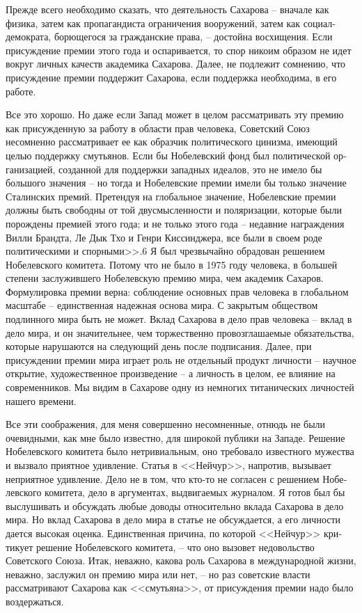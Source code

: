 \documentclass{book}
\begin{document}
Прежде всего необходимо сказать, что деятельность Сахарова -- вначале как физика, затем как пропагандиста ограничения вооружений, затем как социал-демократа, борющегося за гражданские права, -- достойна восхищения. Ес­ли присуждение премии этого года и оспаривается, то спор ни­коим образом не идет вокруг личных качеств академика Са­харова. Далее, не подлежит сомнению, что присуждение пре­мии поддержит Сахарова, если поддержка необходима, в его работе.

Все это хорошо. Но даже если Запад может в целом рассмат­ривать эту премию как присужденную за работу в области прав человека, Советский Союз несомненно рассматривает ее как образчик политического цинизма, имеющий целью поддержку смутьянов. Если бы Нобелевский фонд был политической ор­ганизацией, созданной для поддержки западных идеалов, это не имело бы большого значения -- но тогда и Нобелевские премии имели бы только значение Сталинских премий. Пре­тендуя на глобальное значение, Нобелевские премии должны быть свободны от той двусмысленности и поляризации, кото­рые были порождены премией этого года; и не только этого года -- недавние награждения Вилли Брандта, Ле Дык Тхо и Генри Киссинджера, все были в своем роде политическими и спорными>>.6
Я был чрезвычайно обрадован решением Нобелевского комитета. Потому что не было в 1975 году человека, в большей степени заслужившего Нобелевскую премию мира, чем акаде­мик Сахаров. Формулировка премии верна: соблюдение основ­ных прав человека в глобальном масштабе -- единственная на­дежная основа мира. С закрытым обществом подлинного мира быть не может. Вклад Сахарова в дело прав человека -- вклад в дело мира, и он значительнее, чем торжественно провозгла­шаемые обязательства, которые нарушаются на следующий день после подписания. Далее, при присуждении премии мира играет роль не отдельный продукт личности -- научное открытие, художественное произведение -- а личность в целом, ее влияние на современников. Мы видим в Сахарове одну из немногих титанических личностей нашего времени.

Все эти соображения, для меня совершенно несомненные, отнюдь не были очевидными, как мне было известно, для широ­кой публики на Западе. Решение Нобелевского комитета было нетривиальным, оно требовало известного мужества и вызвало приятное удивление.
Статья в <<Нейчур>>, напротив, вызывает неприятное удив­ление. Дело не в том, что кто-то не согласен с решением Нобе­левского комитета, дело в аргументах, выдвигаемых журналом. Я готов был бы выслушивать и обсуждать любые доводы отно­сительно вклада Сахарова в дело мира. Но вклад Сахарова в дело мира в статье не обсуждается, а его личности дается высо­кая оценка. Единственная причина, по которой <<Нейчур>> кри­тикует решение Нобелевского комитета, -- что оно вызовет недовольство Советского Союза. Итак, неважно, какова роль Сахарова в международной жизни, неважно, заслужил он пре­мию мира или нет, -- но раз советские власти рассматривают Сахарова как <<смутьяна>>, от присуждения премии надо было воздержаться.
\end{document}
